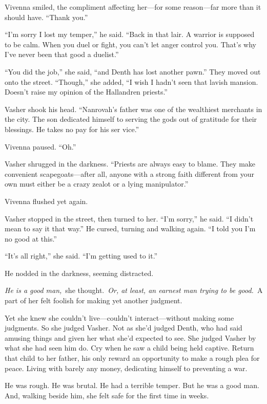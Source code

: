 Vivenna smiled, the compliment affecting her—for some reason—far more than it should have. “Thank you.”

“I’m sorry I lost my temper,” he said. “Back in that lair. A warrior is supposed to be calm. When you duel or fight, you can’t let anger control you. That’s why I’ve never been that good a duelist.”

“You did the job,” she said, “and Denth has lost another pawn.” They moved out onto the street. “Though,” she added, “I wish I hadn’t seen that lavish mansion. Doesn’t raise my opinion of the Hallandren priests.”

Vasher shook his head. “Nanrovah’s father was one of the wealthiest merchants in the city. The son dedicated himself to serving the gods out of gratitude for their blessings. He takes no pay for his ser vice.”

Vivenna paused. “Oh.”

Vasher shrugged in the darkness. “Priests are always easy to blame. They make convenient scapegoats—after all, anyone with a strong faith different from your own must either be a crazy zealot or a lying manipulator.”

Vivenna flushed yet again.

Vasher stopped in the street, then turned to her. “I’m sorry,” he said. “I didn’t mean to say it that way.” He cursed, turning and walking again. “I told you I’m no good at this.”

“It’s all right,” she said. “I’m getting used to it.”

He nodded in the darkness, seeming distracted.

\textit{He is a good man,}~she thought.~\textit{Or, at least, an earnest man trying to be good.}~A part of her felt foolish for making yet another judgment.

Yet she knew she couldn’t live—couldn’t interact—without making some judgments. So she judged Vasher. Not as she’d judged Denth, who had said amusing things and given her what she’d expected to see. She judged Vasher by what she had seen him do. Cry when he saw a child being held captive. Return that child to her father, his only reward an opportunity to make a rough plea for peace. Living with barely any money, dedicating himself to preventing a war.

He was rough. He was brutal. He had a terrible temper. But he was a good man. And, walking beside him, she felt safe for the first time in weeks.

